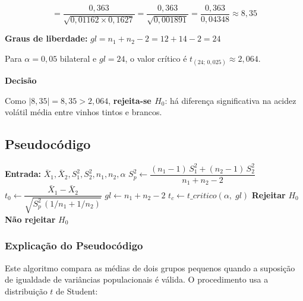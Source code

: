 \documentclass[12pt,a4paper]{article}
\begin{document}
\[
  = \frac{0{,}363}{\sqrt{0{,}01162 \times 0{,}1627}}
  = \frac{0{,}363}{\sqrt{0{,}001891}}
  = \frac{0{,}363}{0{,}04348}
  \approx 8{,}35
\]

\textbf{Graus de liberdade:} $gl = n_1 + n_2 - 2 = 12 + 14 - 2 = 24$

Para $\alpha = 0{,}05$ bilateral e $gl = 24$, o valor crítico é
$t_{(24;\,0{,}025)} \approx 2{,}064$.

\textbf{Decisão}

Como $|{8{,}35}| = 8{,}35 > 2{,}064$, \textbf{rejeita-se $H_0$}: há diferença
significativa na acidez volátil média entre vinhos tintos e brancos.

\subsection*{Pseudocódigo}

\begin{algorithm}[H]
\caption{Teste $t$ -- Amostras Pequenas, Variâncias Iguais (variância agrupada)}
\begin{algorithmic}[1]
  \State \textbf{Entrada:} $\bar{X}_1, \bar{X}_2, S_1^2, S_2^2, n_1, n_2, \alpha$
  \State $S_p^2 \gets \dfrac{(n_1-1)\,S_1^2 + (n_2-1)\,S_2^2}{n_1 + n_2 - 2}$
  \State $t_0 \gets \dfrac{\bar{X}_1 - \bar{X}_2}{\sqrt{S_p^2\,(1/n_1 + 1/n_2)}}$
  \State $gl \gets n_1 + n_2 - 2$
  \State $t_c \gets t\_critico(\alpha,\; gl)$
    \State \textbf{Rejeitar} $H_0$
  \Else
    \State \textbf{Não rejeitar} $H_0$
  \EndIf
\end{algorithmic}
\end{algorithm}

\subsubsection*{Explicação do Pseudocódigo}

Este algoritmo compara as médias de dois grupos pequenos quando a suposição de igualdade
de variâncias populacionais é válida. O procedimento usa a distribuição $t$ de Student:
\end{document}
